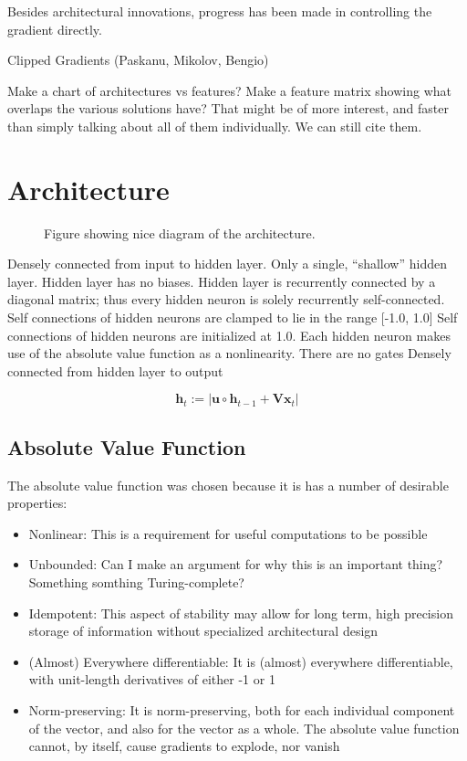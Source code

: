 \documentclass{article}
\begin{document}
Besides architectural innovations, progress has been made in controlling the gradient directly.

Clipped Gradients (Paskanu, Mikolov, Bengio)

Make a chart of architectures vs features?
Make a feature matrix showing what overlaps the various solutions have? That might be of more interest, and faster than simply talking about all of them individually. We can still cite them.

\section{Architecture}
\label{headings}
\begin{figure}
  \centering
  
  \caption{Figure showing nice diagram of the architecture.}
\end{figure}

Densely connected from input to hidden layer.
Only a single, “shallow” hidden layer.
Hidden layer has no biases.
Hidden layer is recurrently connected by a diagonal matrix; thus every hidden neuron is solely recurrently self-connected.
Self connections of hidden neurons are clamped to lie in the range [-1.0, 1.0]
Self connections of hidden neurons are initialized at 1.0.
Each hidden neuron makes use of the absolute value function as a nonlinearity.
There are no gates
Densely connected from hidden layer to output

\begin{equation}
  \mathbf{h}_t := | \mathbf{u} \circ \mathbf{h}_{t-1} + \mathbf{Vx}_t |
\end{equation}

\subsection{Absolute Value Function}

The absolute value function was chosen because it is has a number of desirable properties: 

\begin{itemize}
\item Nonlinear: This is a requirement for useful computations to be possible
\item Unbounded: Can I make an argument for why this is an important thing? Something somthing Turing-complete?
\item Idempotent: This aspect of stability may allow for long term, high precision storage of information without specialized architectural design
\item (Almost) Everywhere differentiable: It is (almost) everywhere differentiable, with unit-length derivatives of either -1 or 1
\item Norm-preserving: It is norm-preserving, both for each individual component of the vector, and also for the vector as a whole.
The absolute value function cannot, by itself, cause gradients to explode, nor vanish
\end{itemize}
\end{document}
